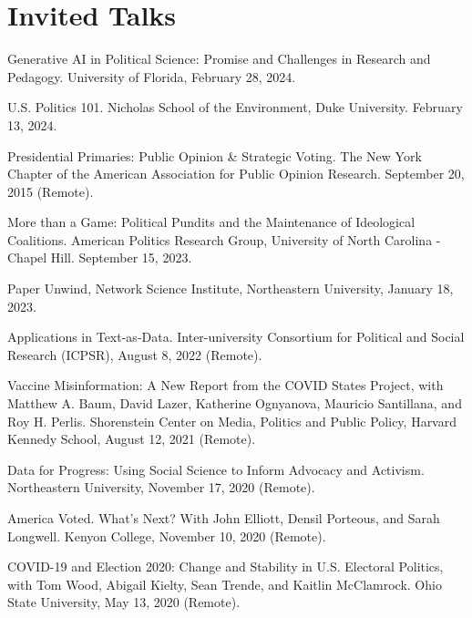\documentclass[letterpaper]{article}
\renewenvironment{itemize}{
  \begin{list}{}{
    \setlength{\leftmargin}{1.5em}
  }
}{
  \end{list}
}
\begin{document}
\section*{Invited Talks}
\begin{itemize}

\item Generative AI in Political Science: Promise and Challenges in Research and Pedagogy. University of Florida, February 28, 2024.

\item U.S. Politics 101. Nicholas School of the Environment, Duke University. February 13, 2024.

\item Presidential Primaries: Public Opinion \& Strategic Voting. The New York Chapter of the American Association for Public Opinion Research. September 20, 2015 (Remote).

\item More than a Game: Political Pundits and the Maintenance of Ideological Coalitions. American Politics Research Group, University of North Carolina - Chapel Hill. September 15, 2023.

\item Paper Unwind, Network Science Institute, Northeastern University, January 18, 2023.

\item Applications in Text-as-Data. Inter-university Consortium for Political and Social Research (ICPSR), August 8, 2022 (Remote). 

\item Vaccine Misinformation: A New Report from the COVID States Project, with Matthew A. Baum, David Lazer, Katherine Ognyanova, Mauricio Santillana, and Roy H. Perlis. Shorenstein Center on Media, Politics and Public Policy, Harvard Kennedy School, August 12, 2021 (Remote).

\item Data for Progress: Using Social Science to Inform Advocacy and Activism. Northeastern University, November 17, 2020 (Remote). 

\item America Voted. What's Next? With John Elliott, Densil Porteous, and Sarah Longwell. Kenyon College, November 10, 2020 (Remote). 

\item COVID-19 and Election 2020: Change and Stability in U.S. Electoral Politics, with Tom Wood, Abigail Kielty, Sean Trende, and Kaitlin McClamrock. Ohio State University, May 13, 2020 (Remote).
 
\end{itemize}
\end{document}
